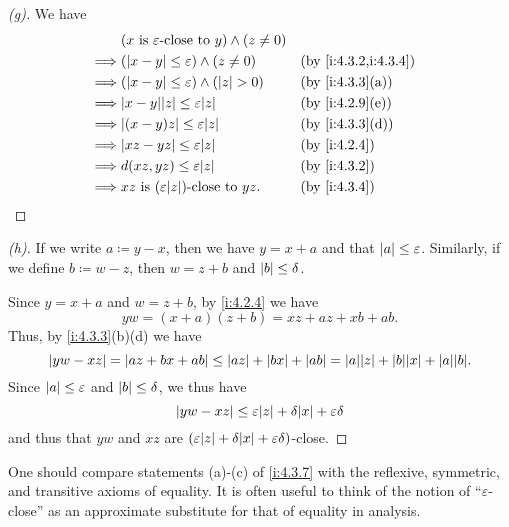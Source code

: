 \begin{proof}[(g)]
  We have
  \begin{align*}
             & (x \text{ is } \varepsilon\text{-close to } y) \land (z \neq 0)                           \\
    \implies & (\abs{x - y} \leq \varepsilon) \land (z \neq 0)                 &  & \by{i:4.3.2,i:4.3.4} \\
    \implies & (\abs{x - y} \leq \varepsilon) \land (\abs{z} > 0)              &  & \by{i:4.3.3}[a]      \\
    \implies & \abs{x - y} \abs{z} \leq \varepsilon \abs{z}                    &  & \by{i:4.2.9}[e]      \\
    \implies & \abs{(x - y)z} \leq \varepsilon \abs{z}                         &  & \by{i:4.3.3}[d]      \\
    \implies & \abs{xz - yz} \leq \varepsilon \abs{z}                          &  & \by{i:4.2.4}         \\
    \implies & d(xz, yz) \leq \varepsilon \abs{z}                              &  & \by{i:4.3.2}         \\
    \implies & xz \text{ is } (\varepsilon \abs{z})\text{-close to } yz.       &  & \by{i:4.3.4}
  \end{align*}
\end{proof}

\begin{proof}[(h)]
  If we write \(a \coloneqq y - x\), then we have \(y = x + a\) and that \(\left\lvert a\right\rvert \leq \varepsilon\).
  Similarly, if we define \(b \coloneqq w - z\), then \(w = z + b\) and \(\left\lvert b\right\rvert \leq \delta\).

  Since \(y = x + a\) and \(w = z + b\), by \cref{i:4.2.4} we have
  \[
    yw = (x + a)(z + b) = xz + az + xb + ab.
  \]
  Thus, by \cref{i:4.3.3}(b)(d) we have
  \[
    \abs{yw - xz} = \abs{az + bx + ab} \leq \abs{az} + \abs{bx} + \abs{ab} = \abs{a}\abs{z} + \abs{b}\abs{x} + \abs{a}\abs{b}.
  \]
  Since \(\left\lvert a\right\rvert \leq \varepsilon\) and \(\left\lvert b\right\rvert \leq \delta\), we thus have
  \[
    \abs{yw - xz} \leq \varepsilon\abs{z} + \delta\abs{x} + \varepsilon\delta
  \]
  and thus that \(yw\) and \(xz\) are \((\varepsilon\abs{z} + \delta\abs{x} + \varepsilon\delta)\)-close.
\end{proof}

\begin{rmk}\label{i:4.3.8}
  One should compare statements (a)-(c) of \cref{i:4.3.7} with the reflexive, symmetric, and transitive axioms of equality.
  It is often useful to think of the notion of ``\(\varepsilon\)-close'' as an approximate substitute for that of equality in analysis.
\end{rmk}

